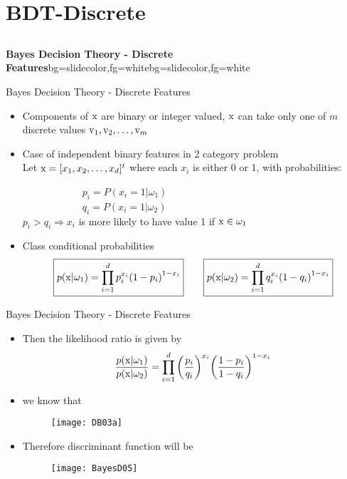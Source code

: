 \section{BDT-Discrete}
\subsection{}
\begin{frame}{}
\begin{variableblock}{\centering \Large \textbf{\vspace{4pt}\newline Bayes Decision Theory - Discrete Features\vspace{4pt}}}{bg=slidecolor,fg=white}{bg=slidecolor,fg=white}
\end{variableblock}
\end{frame}

\begin{frame}{Bayes Decision Theory - Discrete Features}
\begin{itemize}
\item Components of ${\rm x}$ are binary or integer valued, ${\rm x}$ can take only one of $m$ discrete values ${\rm v}_1,{\rm v}_2,\ldots,{\rm v}_m$
\item Case of independent binary features in 2 category problem\\
Let ${\rm x}=[x_1,x_2,\ldots,x_d]^t$ where each $x_i$ is either 0 or 1, with probabilities:

~~~~~~~~~~~~$p_i=P(x_i=1|\omega_1)$\\
~~~~~~~~~~~~$q_i=P(x_i=1|\omega_2)$\\
$p_i>q_i\Rightarrow x_i$ is more likely to have value 1 if ${\rm x}\in \omega_1$
\item Class conditional probabilities
\[\boxed{p({\rm x}|{\omega _1}) = \prod\limits_{i = 1}^d {p_i^{{x_i}}{{\left( {1 - {p_i}} \right)}^{1 - {x_i}}}}} ~~~~~~\boxed{p({\rm x}|{\omega _2}) = \prod\limits_{i = 1}^d {q_i^{{x_i}}{{\left( {1 - {q_i}} \right)}^{1 - {x_i}}}} }\]
\end{itemize}
\end{frame}

\begin{frame}{Bayes Decision Theory - Discrete Features}
\begin{itemize}
\item Then the likelihood ratio is given by
\[\frac{{p({\rm x}|{\omega _1})}}{{p({\rm x}|{\omega _2})}} = \prod\limits_{i = 1}^d {{{\left( {\frac{{{p_i}}}{{{q_i}}}} \right)}^{{x_i}}}{{\left( {\frac{{1 - {p_i}}}{{1 - {q_i}}}} \right)}^{1 - {x_i}}}} \]
\item we know that
\begin{figure}
\texttt{[image: DB03a]}
\end{figure}
\item Therefore discriminant function will be
\begin{figure}
\texttt{[image: BayesD05]}
\end{figure}
\end{itemize}
\end{frame}


